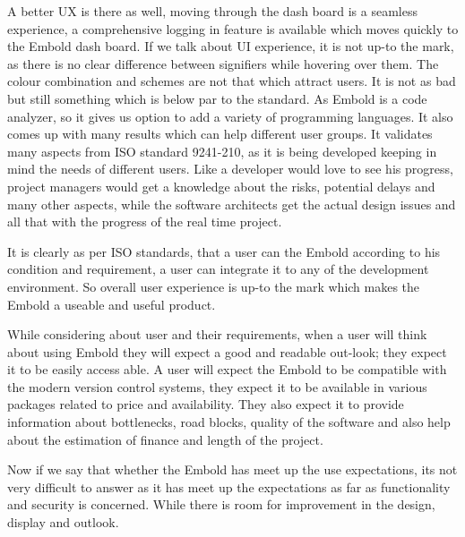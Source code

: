 A better UX is there as well, moving through the dash board is a seamless experience, a comprehensive logging in feature is available which moves quickly to the Embold dash board. 
If we talk about UI experience, it is not up-to the mark, as there is no clear difference between signifiers while hovering over them. The colour combination and schemes are not that which attract users. It is not as bad but still something which is below par to the standard. 
As Embold is a code analyzer, so it gives us option to add a variety of programming languages. It also comes up with many results which can help different user groups. It validates many aspects from ISO standard 9241-210, as it is being developed keeping in mind the needs of different users. Like a developer would love to see his progress, project managers would get a knowledge about the risks, potential delays and many other aspects, while the software architects get the actual design issues and all that with the progress of the real time project. \par
It is clearly as per ISO standards, that a user can the Embold according to his condition and requirement, a user can integrate it to any of the development environment. So overall user experience is up-to the mark which makes the Embold a useable and useful product. \par
While considering about user and their requirements, when a user will think about using Embold they will expect a good and readable out-look; they expect it to be easily access able. A user will expect the Embold to be compatible with the modern version control systems, they expect it to be available in various packages related to price and availability. They also expect it to provide information about bottlenecks, road blocks, quality of the software and also help about the estimation of finance and length of the project. \par
Now if we say that whether the Embold has meet up the use expectations, its not very difficult to answer as it has meet up the expectations as far as functionality and security is concerned. While there is room for improvement  in the design, display and outlook.  
